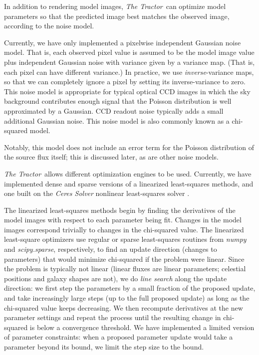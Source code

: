 \documentclass[modern, linenumbers]{aastex631}
\newcommand{\thetractor}{\emph{The Tractor}}
\begin{document}
In addition to rendering model images, \thetractor\ can optimize
model parameters so that the predicted image best matches the observed image, according to the noise model.

Currently, we have only implemented a pixelwise independent Gaussian noise model.  That is, each observed pixel value is assumed to be the model image value plus independent Gaussian noise with variance given by a variance map.  (That is, each pixel can have different variance.)  In practice, we use \emph{inverse}-variance maps, so that we can completely ignore a pixel by setting its inverse-variance to zero.  This noise model is appropriate for typical optical CCD images in which the sky background contributes enough signal that the Poisson distribution is well approximated by a Gaussian.  CCD readout noise typically adds a small additional Gaussian noise.  This noise model is also commonly known as a chi-squared model.

Notably, this model does not include an error term for the Poisson distribution of the source flux itself; this is discussed later, as are other noise models.

\thetractor\ allows different optimization engines to be used.  Currently, we have implemented dense and sparse versions of a linearized least-squares methods, and one built on the \emph{Ceres Solver} nonlinear least-squares solver \citep{ceres}.

The linearized least-squares methods begin by finding the derivatives of the model images with respect to each parameter being fit.  Changes in the model images correspond trivially to changes in the chi-squared value.  The linearized least-square optimizers use regular or sparse least-squares routines from \emph{numpy} and \emph{scipy.sparse}, respectively, to find an update direction (changes to parameters) that would minimize chi-squared if the problem were linear.  Since the problem is typically not linear (linear fluxes are linear parameters; celestial positions and galaxy shapes are not), we do \emph{line search} along the update direction: we first step the parameters by a small fraction of the proposed update, and take increasingly large steps (up to the full proposed update) as long as the chi-squared value keeps decreasing.  We then recompute derivatives at the new parameter settings and repeat the process until the resulting change in chi-squared is below a convergence threshold.  We have implemented a limited version of parameter constraints: when a proposed parameter update would take a parameter beyond its bound, we limit the step size to the bound.
\end{document}
